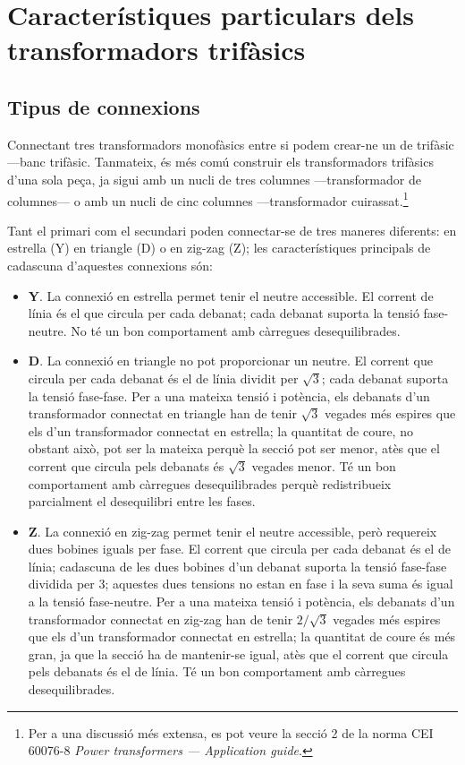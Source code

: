 \section{Característiques particulars  dels transformadors trifàsics}\label{sec:caract-trans-trif}

\subsection{Tipus de connexions}


Connectant tres transformadors monofàsics entre si podem crear-ne un de trifàsic ---banc trifàsic. Tanmateix, és més comú construir els transformadors trifàsics d'una sola peça, ja sigui amb un nucli de tres columnes ---transformador de columnes--- o amb un nucli de cinc columnes ---transformador cuirassat.\footnote{Per a una discussió més extensa, es pot veure la secció 2 de la norma CEI 60076-8 \emph{Power transformers --- Application guide}.}

Tant el primari com el secundari poden connectar-se de tres maneres diferents: en estrella (Y) en triangle (D) o en zig-zag (Z); les característiques principals de cadascuna d'aquestes connexions són:

\begin{itemize}
   \item \textbf{Y}. La connexió en estrella permet tenir el neutre accessible. El corrent de línia és el que circula per cada debanat; cada debanat suporta la tensió fase-neutre. No té un bon comportament amb càrregues desequilibrades.
   \item \textbf{D}. La connexió en triangle no pot proporcionar un neutre. El corrent que circula per cada debanat és el de línia dividit per $\sqrt{3}$; cada debanat suporta la tensió fase-fase. Per a una mateixa tensió i potència, els debanats d'un transformador connectat en triangle han de tenir $\sqrt{3}$ vegades més espires que els d'un transformador connectat en estrella; la quantitat de coure, no obstant això, pot ser la mateixa perquè la secció pot ser menor, atès que el corrent que circula pels debanats és $\sqrt{3}$ vegades menor. Té un bon comportament amb càrregues desequilibrades perquè redistribueix parcialment el desequilibri entre les fases.
   \item \textbf{Z}. La connexió en zig-zag permet tenir el neutre accessible, però requereix dues bobines iguals per fase. El corrent que circula per cada debanat és el de línia; cadascuna de les dues bobines d'un debanat suporta la tensió fase-fase dividida per 3; aquestes dues tensions no estan en fase i la seva suma és igual a la tensió fase-neutre. Per a una mateixa tensió i potència, els debanats d'un transformador connectat en zig-zag han de tenir $2/\sqrt{3}$ vegades més espires que els d'un transformador connectat en estrella; la quantitat de coure és més gran, ja que la secció ha de mantenir-se igual, atès que el corrent que circula pels debanats és el de línia. Té un bon comportament amb càrregues desequilibrades.
\end{itemize}

